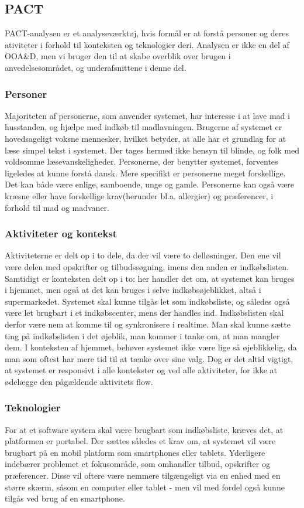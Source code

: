 \subsection{PACT}
PACT-analysen er et analyseværktøj, hvis formål er at forstå personer og deres ativiteter i forhold til konteksten og teknologier deri.
Analysen er ikke en del af OOA\&D, men vi bruger den til at skabe overblik over brugen i anvedelsesområdet, og underafsnittene i denne del.

\subsubsection{Personer}
Majoriteten af personerne, som anvender systemet, har interesse i at lave mad i husstanden, og hjælpe med indkøb til madlavningen.
Brugerne af systemet er hovedsageligt voksne mennesker, hvilket betyder, at alle har et grundlag for at læse simpel tekst i systemet.
Der tages hermed ikke hensyn til blinde, og folk med voldsomme læsevanskeligheder.
Personerne, der benytter systemet, forventes ligeledes at kunne forstå dansk.
Mere specifikt er personerne meget forskellige.
Det kan både være enlige, samboende, unge og gamle.
Personerne kan også være kræsne eller have forskellige krav(herunder bl.a. allergier) og præferencer, i forhold til mad og madvaner.

\subsubsection{Aktiviteter og kontekst}
Aktiviteterne er delt op i to dele, da der vil være to delløsninger.
Den ene vil være delen med opskrifter og tilbudssøgning, imens den anden er indkøbslisten.
Samtidigt er konteksten delt op i to: her handler det om, at systemet kan bruges i hjemmet, men også at det kan bruges i selve indkøbsøjeblikket, altså i supermarkedet.
Systemet skal kunne tilgås let som indkøbsliste, og således også være let brugbart i et indkøbscenter, mens der handles ind.
Indkøbslisten skal derfor være nem at komme til og synkronisere i realtime.
Man skal kunne sætte ting på indkøbslisten i det øjeblik, man kommer i tanke om, at man mangler dem.
I konteksten af hjemmet, behøver systemet ikke være lige så øjeblikkelig, da man som oftest har mere tid til at tænke over sine valg.
Dog er det altid vigtigt, at systemet er responsivt i alle kontekster og ved alle aktiviteter, for ikke at ødelægge den pågældende aktivitets flow.

\subsubsection{Teknologier}
For at et software system skal være brugbart som indkøbsliste, kræves det, at platformen er portabel.
Der sættes således et krav om, at systemet vil være brugbart på en mobil platform som smartphones eller tablets.
Yderligere indebærer problemet et fokusområde, som omhandler tilbud, opskrifter og præferencer.
Disse vil oftere være nemmere tilgængeligt via en enhed med en større skærm, såsom en computer eller tablet - men vil med fordel også kunne tilgås ved brug af en smartphone.
